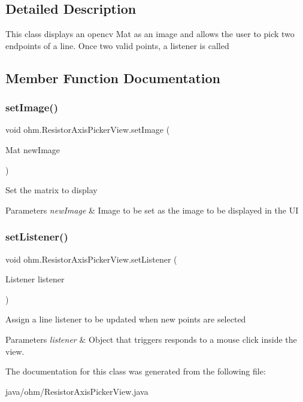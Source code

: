 \subsection{Detailed Description}
This class displays an opencv Mat as an image and allows the user to pick two endpoints of a line. Once two valid points, a listener is called 

\subsection{Member Function Documentation}
\hypertarget{classohm_1_1_resistor_axis_picker_view_a9c5a8a703fcad60662496c9d18e5a557}{}\label{classohm_1_1_resistor_axis_picker_view_a9c5a8a703fcad60662496c9d18e5a557} 
\subsubsection{\texorpdfstring{set\+Image()}{setImage()}}
{\footnotesize\ttfamily void ohm.\+Resistor\+Axis\+Picker\+View.\+set\+Image (\begin{DoxyParamCaption}\item[{Mat}]{new\+Image }\end{DoxyParamCaption})}

Set the matrix to display 
\begin{DoxyParams}{Parameters}
{\em new\+Image} & Image to be set as the image to be displayed in the UI \\
\hline
\end{DoxyParams}
\hypertarget{classohm_1_1_resistor_axis_picker_view_ab8d6349385ce137a6c08fee819bbaf8b}{}\label{classohm_1_1_resistor_axis_picker_view_ab8d6349385ce137a6c08fee819bbaf8b} 
\subsubsection{\texorpdfstring{set\+Listener()}{setListener()}}
{\footnotesize\ttfamily void ohm.\+Resistor\+Axis\+Picker\+View.\+set\+Listener (\begin{DoxyParamCaption}\item[{Listener}]{listener }\end{DoxyParamCaption})}

Assign a line listener to be updated when new points are selected 
\begin{DoxyParams}{Parameters}
{\em listener} & Object that triggers responds to a mouse click inside the view. \\
\hline
\end{DoxyParams}


The documentation for this class was generated from the following file\+:\begin{DoxyCompactItemize}
\item 
java/ohm/Resistor\+Axis\+Picker\+View.\+java\end{DoxyCompactItemize}
